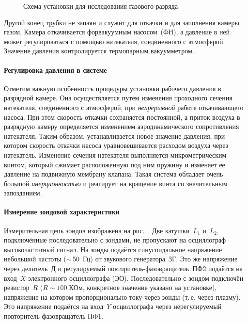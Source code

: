 \begin{figure}[h]
    \centering
    \caption{Схема установки для исследования газового разряда}
\end{figure}

Другой конец трубки не запаян и служит для откачки и для заполнения камеры газом. 
Камера откачивается форвакуумным насосом~(ФН), а давление в ней может
регулироваться с помощью натекателя, соединенного с атмосферой.
Значение давления контролируется термопарным вакуумметром.

\paragraph{Регулировка давления в системе}
Отметим важную особенность процедуры установки рабочего давления в
разрядной камере. Она осуществляется путем изменения
проходного сечения натекателя, соединенного с атмосферой, при 
\emph{непрерывной} работе откачивающего насоса. 
При этом скорость откачки сохраняется постоянной, а приток
воздуха в разрядную камеру определяется изменением аэродинамического
сопротивления натекателя. Таким образом, устанавливается новое значение
давления, при котором скорость откачки насоса уравновешивается расходом воздуха
через натекатель. Изменение сечения натекателя выполняется микрометрическим 
винтом, который сжимает расположенную под ним пружину и изменяет 
ее давление на подвижную
мембрану клапана. Такая система обладает очень большой \emph{инерционностью} и
реагирует на вращение винта со значительным запозданием.

\paragraph{Измерение зондовой характеристики}
Измерительная цепь зондов изображена на рис.~.
Две катушки~$L_{1}$ и~$L_{2}$, подключённые последовательно с зондами, 
не пропускают на осциллограф высокочастотный сигнал.
На зонды подаётся синусоидальное напряжение небольшой частоты 
($\sim$\,50~Гц) от звукового генератора~ЗГ.
Это же напряжение через делитель~Д и регулируемый 
повторитель-фазовращатель~ПФ2 подаётся на вход~$X$ электронного осциллографа
(ЭО). Последовательно с зондом подключён резистор~$R$ 
($R\sim 100\;КОм$, конкретное значение указано на установке),
напряжение на котором пропорционально току через зонды (т.\,е. через плазму).
Это напряжение подаётся на вход~$Y$ осциллографа 
через нерегулируемый повторитель-фазовращатель ПФ1. 

